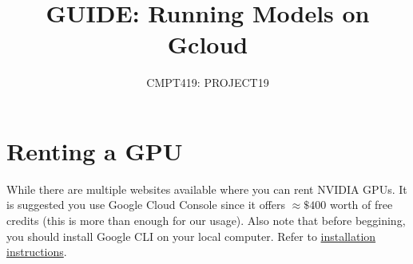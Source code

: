 \documentclass[12pt]{article}
\title{GUIDE: Running Models on Gcloud}
\author{CMPT419: PROJECT19}
\date{}
\begin{document}
\maketitle
\vspace{-1cm}

\section{Renting a GPU}
While there are multiple websites available where you can rent NVIDIA GPUs. It is suggested you use Google Cloud Console since it offers $\approx\$400$ worth of free credits (this is more than enough for our usage). Also note that before beggining, you should install Google CLI on your local computer. Refer to \href{https://cloud.google.com/sdk/docs/install}{installation instructions}.\\
\end{document}
